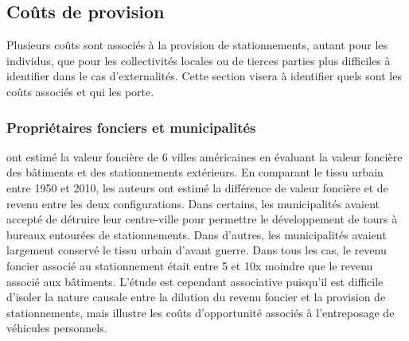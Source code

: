   

  
  \subsection{Coûts de provision}
    Plusieurs coûts sont associés à la provision de stationnements, autant pour les individus, que pour les collectivités locales ou de tierces parties plus difficiles à identifier dans le cas d'externalités. Cette section visera à identifier quels sont les coûts associés et qui les porte.

    \subsubsection{Propriétaires fonciers et municipalités}
      \textcite{Blanc:EffectsUrban:2014} ont estimé la valeur foncière de 6 villes américaines en évaluant la valeur foncière des bâtiments et des stationnements extérieurs. En comparant le tissu urbain entre 1950 et 2010, les auteurs ont estimé la différence de valeur foncière et de revenu entre les deux configurations. Dans certains, les municipalités avaient accepté de détruire leur centre-ville pour permettre le développement de tours à bureaux entourées de stationnements. Dans d'autres, les municipalités avaient largement conservé le tissu urbain d'avant guerre. Dans tous les cas, le revenu foncier associé au stationnement était entre 5 et 10x moindre que le revenu associé aux bâtiments. L'étude est cependant associative puisqu'il est difficile d'isoler la nature causale entre la dilution du revenu foncier et la provision de stationnements, mais illustre les coûts d'opportunité associés à l'entreposage de véhicules personnels. \par

